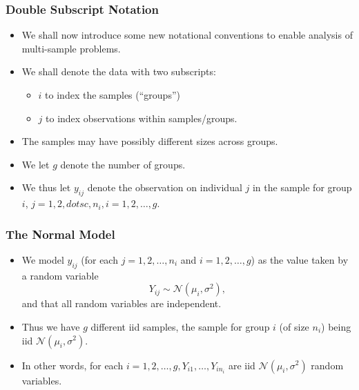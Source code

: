 \documentclass[a4paper]{article}\usepackage[]{graphicx}\usepackage[]{xcolor}
\begin{document}
\subsubsection{Double Subscript Notation}
\begin{itemize}
	\item We shall now introduce some new notational conventions to enable analysis of multi-sample problems.
	\item We shall denote the data with two subscripts:
	\begin{itemize}
		\item \( i \) to index the samples (``groups'')
		\item \( j \) to index observations within samples/groups.
	\end{itemize}
	\item The samples may have possibly different sizes across groups.
	\item We let \( g \) denote the number of groups.
	\item We thus let \( y_{ij} \) denote the observation on individual \( j \) in the sample for group \( i \), \( j = 1,2,dotsc, n_i, i = 1,2,\dotsc,g \).
\end{itemize}
\subsubsection{The Normal Model}
\begin{itemize}
	\item We model \( y_{ij} \) (for each \( j = 1,2,\dotsc,n_i \) and \( i = 1,2,\dotsc,g \)) as the value taken by a random variable
	\[
		Y_{ij} \sim \mathcal{N} (\mu_i,\sigma^2),
	\]
	and that all random variables are independent.
	\item Thus we have \( g \) different iid samples, the sample for group \( i \) (of size \( n_i \)) being iid \( \mathcal{N} (\mu_i,\sigma^2) \).
	\item In other words, for each \( i = 1,2,\dotsc,g, Y_{i1}, \dotsc, Y_{in_{i}} \) are iid \( \mathcal{N} (\mu_i,\sigma^2) \) random variables.
\end{itemize}
\end{document}
